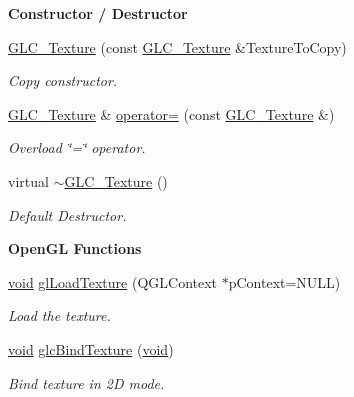 \begin{Indent}{\bf Constructor / Destructor}
\begin{DoxyCompactItemize}
\hyperlink{class_g_l_c___texture_a47eae83b9a37647a94cda97b1600cb37}{G\-L\-C\-\_\-\-Texture} (const \hyperlink{class_g_l_c___texture}{G\-L\-C\-\_\-\-Texture} \&Texture\-To\-Copy)
\begin{DoxyCompactList}\small\item\em Copy constructor. \end{DoxyCompactList}\item 
\hyperlink{class_g_l_c___texture}{G\-L\-C\-\_\-\-Texture} \& \hyperlink{class_g_l_c___texture_a8e436c2d371d5e99c7fd623cf51d0ced}{operator=} (const \hyperlink{class_g_l_c___texture}{G\-L\-C\-\_\-\-Texture} \&)
\begin{DoxyCompactList}\small\item\em Overload \char`\"{}=\char`\"{} operator. \end{DoxyCompactList}\item 
virtual \hyperlink{class_g_l_c___texture_a1bcc0477afde8277665b6f49611e261f}{$\sim$\-G\-L\-C\-\_\-\-Texture} ()
\begin{DoxyCompactList}\small\item\em Default Destructor. \end{DoxyCompactList}\end{DoxyCompactItemize}
\end{Indent}
\begin{Indent}{\bf Open\-G\-L Functions}\par
\begin{DoxyCompactItemize}
\item 
\hyperlink{group___u_a_v_objects_plugin_ga444cf2ff3f0ecbe028adce838d373f5c}{void} \hyperlink{class_g_l_c___texture_a131a6e72f37f449162dc4c7e3fd827b8}{gl\-Load\-Texture} (Q\-G\-L\-Context $\ast$p\-Context=N\-U\-L\-L)
\begin{DoxyCompactList}\small\item\em Load the texture. \end{DoxyCompactList}\item 
\hyperlink{group___u_a_v_objects_plugin_ga444cf2ff3f0ecbe028adce838d373f5c}{void} \hyperlink{class_g_l_c___texture_af63e9de56cc3040c4a24e50e4553cf61}{glc\-Bind\-Texture} (\hyperlink{group___u_a_v_objects_plugin_ga444cf2ff3f0ecbe028adce838d373f5c}{void})
\begin{DoxyCompactList}\small\item\em Bind texture in 2\-D mode. \end{DoxyCompactList}\end{DoxyCompactItemize}
\end{Indent}
